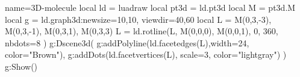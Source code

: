 \documentclass[border=5pt]{standalone}%
\begin{document}
\begin{luadraw}{name=3D-molecule}
local ld = luadraw
local pt3d = ld.pt3d
local M = pt3d.M
local g = ld.graph3d:new{size={10,10}, viewdir={40,60}}
local L = {M(0,3,-3), M(0,3,-1), M(0,3,1), M(0,3,3)}
L = ld.rotline(L, {M(0,0,0), M(0,0,1)}, 0, 360, {nbdots=8} )
g:Dscene3d(
    g:addPolyline(ld.facetedges(L),{width=24, color="Brown"}),
    g:addDots(ld.facetvertices(L), {scale=3, color="lightgray"})
)
g:Show() 
\end{luadraw}
\end{document}
